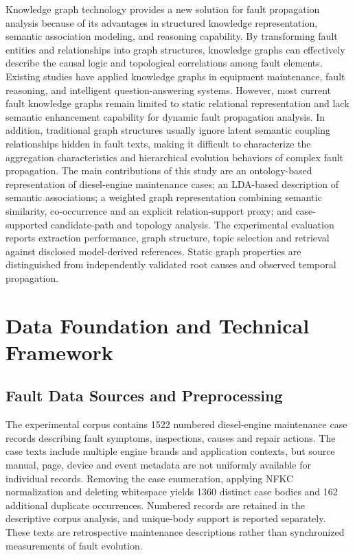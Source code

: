 \documentclass[
aps,%
12pt,%
final,%
notitlepage,%
oneside,%
onecolumn,%
nobibnotes,%
nofootinbib,%
superscriptaddress,%
noshowpacs,%
centertags]%
{revtex4}
\begin{document}
Knowledge graph technology provides a new solution for fault propagation analysis because of its advantages in structured knowledge representation, semantic association modeling, and reasoning capability\cite{paul2019compact}. By transforming fault entities and relationships into graph structures, knowledge graphs can effectively describe the causal logic and topological correlations among fault elements. Existing studies have applied knowledge graphs in equipment maintenance, fault reasoning, and intelligent question-answering systems. However, most current fault knowledge graphs remain limited to static relational representation and lack semantic enhancement capability for dynamic fault propagation analysis\cite{chen2024information}. In addition, traditional graph structures usually ignore latent semantic coupling relationships hidden in fault texts, making it difficult to characterize the aggregation characteristics and hierarchical evolution behaviors of complex fault propagation.
The main contributions of this study are an ontology-based representation of diesel-engine maintenance cases; an LDA-based description of semantic associations; a weighted graph representation combining semantic similarity, co-occurrence and an explicit relation-support proxy; and case-supported candidate-path and topology analysis. The experimental evaluation reports extraction performance, graph structure, topic selection and retrieval against disclosed model-derived references. Static graph properties are distinguished from independently validated root causes and observed temporal propagation.
\section{Data Foundation and Technical Framework}
\subsection{Fault Data Sources and Preprocessing}
The experimental corpus contains 1522 numbered diesel-engine maintenance case records describing fault symptoms, inspections, causes and repair actions. The case texts include multiple engine brands and application contexts, but source manual, page, device and event metadata are not uniformly available for individual records. Removing the case enumeration, applying NFKC normalization and deleting whitespace yields 1360 distinct case bodies and 162 additional duplicate occurrences. Numbered records are retained in the descriptive corpus analysis, and unique-body support is reported separately. These texts are retrospective maintenance descriptions rather than synchronized measurements of fault evolution.
\end{document}

